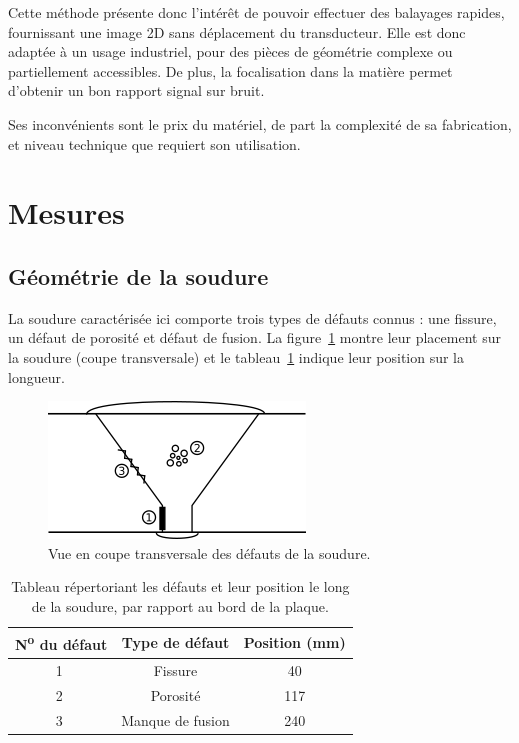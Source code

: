 \documentclass[twoside]{article}
\begin{document}
\begin{multicols}{2}
Cette méthode présente donc l'intérêt de pouvoir effectuer des balayages rapides, fournissant une image 2D sans déplacement du transducteur. Elle est donc adaptée à un usage industriel, pour des pièces de géométrie complexe ou partiellement accessibles. De plus, la focalisation dans la matière permet d'obtenir un bon rapport signal sur bruit.

Ses inconvénients sont le prix du matériel, de part la complexité de sa fabrication, et niveau technique que requiert son utilisation. 


\section{Mesures}

\subsection{Géométrie de la soudure}

La soudure caractérisée ici comporte trois types de défauts connus : une fissure, un défaut de porosité et défaut de fusion. La figure~\ref{soudure} montre leur placement sur la soudure (coupe transversale) et le tableau~\ref{position} indique leur position sur la longueur.

\begin{figure}[H]
	\centering
	\includegraphics[scale=0.9]{images/soudure.png}
	\caption{\label{soudure}Vue en coupe transversale des défauts de la soudure.}
\end{figure}

\begin{table}[H]
	\centering
	\begin{tabular}{c | c | c}
		N\textsuperscript{o} du défaut & Type de défaut & Position (mm) \\\hline
		\textcircled{\footnotesize 1} & Fissure & 40 \\ \hline
		\textcircled{\footnotesize 2} & Porosité & 117 \\ \hline
		\textcircled{\footnotesize 3} & Manque de fusion & 240 \\ 
	\end{tabular}	
	\caption{\label{position}Tableau répertoriant les défauts et leur position le long de la soudure, par rapport au bord de la plaque.}
\end{table}


\end{multicols}
\end{document}
